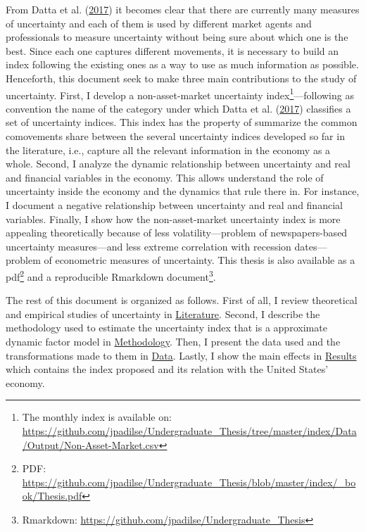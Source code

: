 \documentclass[12pt,twoside]{reedthesis}
\begin{document}
From Datta et al. (\protect\hyperlink{ref-dattlondsunbeltferriacojahaligiudroge:2017}{2017}) it becomes clear that there are currently many measures of uncertainty and each of them is used by different market agents and professionals to measure uncertainty without being sure about which one is the best. Since each one captures different movements, it is necessary to build an index following the existing ones as a way to use as much information as possible. Henceforth, this document seek to make three main contributions to the study of uncertainty. First, I develop a non-asset-market uncertainty index\footnote{The monthly index is available on: \url{https://github.com/jpadilse/Undergraduate_Thesis/tree/master/index/Data/Output/Non-Asset-Market.csv}}---following as convention the name of the category under which Datta et al. (\protect\hyperlink{ref-dattlondsunbeltferriacojahaligiudroge:2017}{2017}) classifies a set of uncertainty indices. This index has the property of summarize the common comovements share between the several uncertainty indices developed so far in the literature, i.e., capture all the relevant information in the economy as a whole. Second, I analyze the dynamic relationship between uncertainty and real and financial variables in the economy. This allows understand the role of uncertainty inside the economy and the dynamics that rule there in. For instance, I document a negative relationship between uncertainty and real and financial variables. Finally, I show how the non-asset-market uncertainty index is more appealing theoretically because of less volatility---problem of newspapers-based uncertainty measures---and less extreme correlation with recession dates---problem of econometric measures of uncertainty. This thesis is also available as a pdf\footnote{PDF: \url{https://github.com/jpadilse/Undergraduate_Thesis/blob/master/index/_book/Thesis.pdf}} and a reproducible Rmarkdown document\footnote{Rmarkdown: \url{https://github.com/jpadilse/Undergraduate_Thesis}}.

The rest of this document is organized as follows. First of all, I review theoretical and empirical studies of uncertainty in \protect\hyperlink{literature}{Literature}. Second, I describe the methodology used to estimate the uncertainty index that is a approximate dynamic factor model in \protect\hyperlink{methodology}{Methodology}. Then, I present the data used and the transformations made to them in \protect\hyperlink{data}{Data}. Lastly, I show the main effects in \protect\hyperlink{results}{Results} which contains the index proposed and its relation with the United States' economy.
\end{document}
